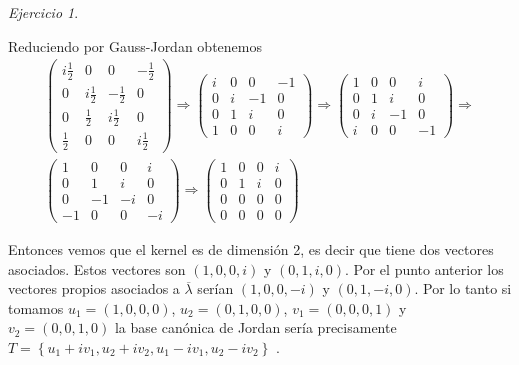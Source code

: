 \documentclass[11pt,a4paper]{article}
\theoremstyle{definition}
\theoremstyle{remark}
\newtheorem{exc}{Ejercicio}
\newcommand{\set}[1]{\left\lbrace #1 \right\rbrace}
\begin{document}
\begin{exc}
\begin{enumerate}
							Reduciendo por Gauss-Jordan obtenemos
							\begin{multline}
							\begin{pmatrix}
							i\frac{1}{2} & 0 & 0 & -\frac{1}{2}
							\\ 0 & i\frac{1}{2} & -\frac{1}{2} & 0 
							\\ 0 & \frac{1}{2} & i\frac{1}{2} & 0
							\\ \frac{1}{2} & 0 & 0 & i\frac{1}{2}
							\end{pmatrix} \Rightarrow
							\begin{pmatrix}
							i & 0 & 0 & -1
							\\ 0 & i & -1 & 0 
							\\ 0 & 1 & i & 0
							\\ 1 & 0 & 0 & i
							\end{pmatrix} \Rightarrow
							\begin{pmatrix}
							1 & 0 & 0 & i
							\\ 0 & 1 & i & 0
							\\ 0 & i & -1 & 0 
							\\ i & 0 & 0 & -1
							\end{pmatrix}
							\Rightarrow
							\\ \begin{pmatrix}
							1 & 0 & 0 & i
							\\ 0 & 1 & i & 0
							\\ 0 & -1 & -i & 0 
							\\ -1 & 0 & 0 & -i
							\end{pmatrix}
							\Rightarrow
							\begin{pmatrix}
							1 & 0 & 0 & i
							\\ 0 & 1 & i & 0
							\\ 0 & 0 & 0 & 0 
							\\ 0 & 0 & 0 & 0
							\end{pmatrix}
							 \nonumber		
							\end{multline}
							
							Entonces vemos que el kernel es de dimensión 2, es decir que tiene dos vectores asociados. Estos vectores son $ (1, 0,0,i) $ y $ (0,1,i,0) $. Por el punto anterior los vectores propios asociados a $ \overline{\lambda} $ serían $ (1, 0,0,-i) $ y $ (0,1,-i,0) $. Por lo tanto si tomamos $ u_1 = (1,0,0,0) $, $ u_2=(0,1,0,0) $, $ v_1=(0,0,0,1) $ y $ v_2 = (0,0,1,0) $ la base canónica de Jordan sería precisamente $ T = \set{u_1 + i v_1, u_2 + i v_2, u_1 - i v_1, u_2 - iv_2 } $ .
							

\end{enumerate}
\end{exc}
\end{document}
